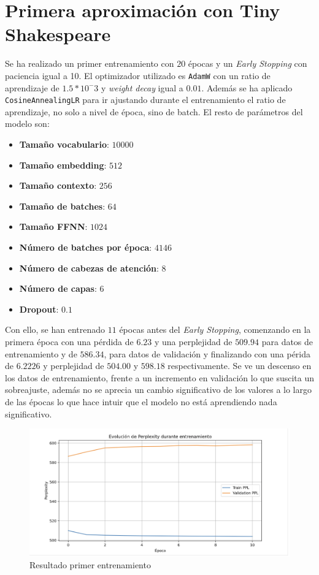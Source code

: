 \documentclass[11pt]{book}
\begin{document}
\section{Primera aproximación con Tiny Shakespeare} \label{subsec:fine-tuning}

Se ha realizado un primer entrenamiento con $20$ épocas y un \textit{Early Stopping} con paciencia igual a 10. El optimizador utilizado es \texttt{AdamW} con un ratio de aprendizaje de $1.5*10^-3$ y \textit{weight decay} igual a $0.01$. Además se ha aplicado \texttt{CosineAnnealingLR} para ir ajustando durante el entrenamiento el ratio de aprendizaje, no solo a nivel de época, sino de batch. El resto de parámetros del modelo son: 

\begin{itemize}
    \item \textbf{Tamaño vocabulario}: $10000$
    \item \textbf{Tamaño embedding}: $512$
    \item \textbf{Tamaño contexto}: $256$
    \item \textbf{Tamaño de batches}: $64$
    \item \textbf{Tamaño FFNN}: $1024$
    \item \textbf{Número de batches por época}: $4146$
    \item \textbf{Número de cabezas de atención}: $8$
    \item \textbf{Número de capas}: $6$
    \item \textbf{Dropout}: $0.1$
\end{itemize}

Con ello, se han entrenado $11$ épocas antes del \textit{Early Stopping}, comenzando en la primera época con una pérdida de $6.23$ y una perplejidad de  $509.94$ para datos de entrenamiento y de $586.34$, para datos de validación y finalizando con una périda de $6.2226$ y perplejidad de $504.00$ y $598.18$ respectivamente. Se ve un descenso en los datos de entrenamiento, frente a un incremento en validación lo que suscita un sobreajuste, además no se aprecia un cambio significativo de los valores a lo largo de las épocas lo que hace intuir que el modelo no está aprendiendo nada significativo.

\begin{figure}[h]
    \centering
    \includegraphics[width=0.5\linewidth]{img/resultado_entrenamiento_v1.png}
    \caption{Resultado primer entrenamiento}
    \label{fig:placeholder24}
\end{figure}
\end{document}
